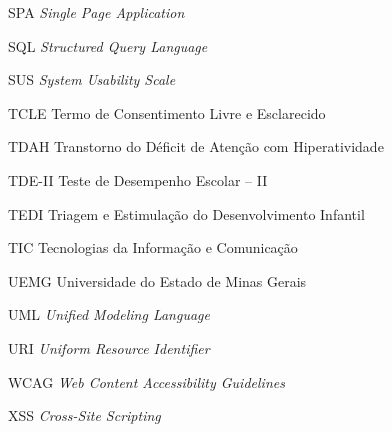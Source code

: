 \begin{siglas}
  \item[SPA] \textit{Single Page Application}

  \item[SQL] \textit{Structured Query Language}

  \item[SUS] \textit{System Usability Scale}

  \item[TCLE] Termo de Consentimento Livre e Esclarecido

  \item[TDAH] Transtorno do Déficit de Atenção com Hiperatividade

  \item[TDE-II] Teste de Desempenho Escolar -- II

  \item[TEDI] Triagem e Estimulação do Desenvolvimento Infantil

  \item[TIC] Tecnologias da Informação e Comunicação

  \item[UEMG] Universidade do Estado de Minas Gerais

  \item[UML] \textit{Unified Modeling Language}

  \item[URI] \textit{Uniform Resource Identifier}

  \item[WCAG] \textit{Web Content Accessibility Guidelines}

  \item[XSS] \textit{Cross-Site Scripting}

\end{siglas}